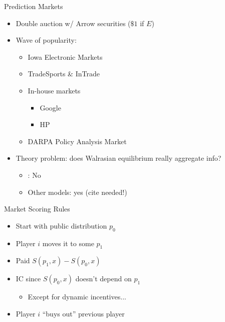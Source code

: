 \begin{frame}{Prediction Markets}
\begin{itemize}
    \item Double auction w/ Arrow securities ($\$1$ if $E$)
    \item Wave of popularity: \citet{WolfersZitzewitz2004}
    \begin{itemize}
        \item Iowa Electronic Markets \citep{BergEtAl1996}
        \item TradeSports \& InTrade
        \item In-house markets
        \begin{itemize}
            \item Google \citep{CowgillEtAl2009}
            \item HP \citep{HoChen2007}
        \end{itemize}
        \item DARPA Policy Analysis Market \citep{Hanson2007}
    \end{itemize}
    \item Theory problem: does Walrasian equilibrium really aggregate info?
    \begin{itemize}
        \item \citet{Manski2006}: No
        \item Other models: yes (cite needed!)
    \end{itemize}
\end{itemize}
\end{frame}

\begin{frame}{Market Scoring Rules}
\cite{Hanson2003,LedyardEtAl2009}
        \begin{itemize}
            \item Start with public distribution $p_0$
            \item Player $i$ moves it to some $p_1$
            \item Paid $S(p_1,x) - S(p_0,x)$
            \item IC since $S(p_0,x)$ doesn't depend on $p_1$
            \begin{itemize}
                \item Except for dynamic incentives...
            \end{itemize}
            \item Player $i$ ``buys out'' previous player
        \end{itemize}
\end{frame}

